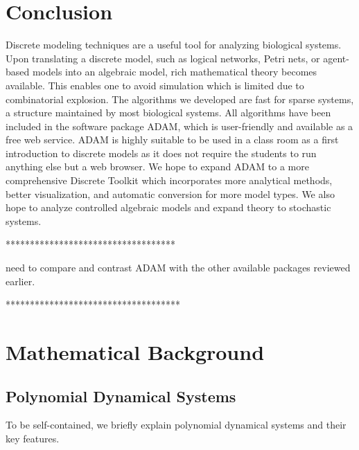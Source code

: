 \documentclass[11pt]{amsart}
\begin{document}
\section{Conclusion}
Discrete modeling techniques are a useful tool for analyzing biological
systems. Upon translating a discrete model, such as logical networks,
Petri nets, or agent-based models into an algebraic model, rich mathematical
theory becomes available. This enables one to
avoid simulation which is limited due to combinatorial explosion. The algorithms
we developed are fast for sparse systems, a structure maintained by most biological
systems. All algorithms have been included in the software package ADAM\cite{ADAM},
which is user-friendly and available as a free web service.
ADAM is highly suitable to be used in a class room as a first
introduction to discrete models as it does not require the students to run
anything else but a web browser.
We hope to expand ADAM to a more comprehensive Discrete Toolkit which incorporates more
analytical methods, better visualization, and automatic conversion for more model types.
We also hope to analyze controlled algebraic models and expand theory to stochastic systems.
 
***********************************
 
need to compare and contrast ADAM with the other available packages reviewed earlier.
 
************************************
\appendix
\section{Mathematical Background}
\subsection{Polynomial Dynamical Systems}
To be self-contained, we briefly explain polynomial dynamical systems and their key features.
 
\end{document}
